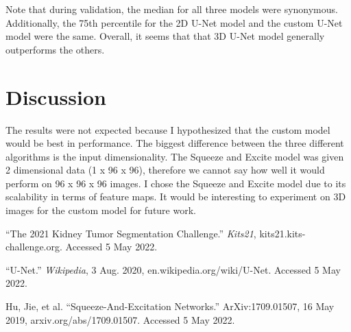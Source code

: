 \documentclass [12pt, letterpaper] {article}
\begin{document}
Note that during validation, the median for all three models were synonymous. Additionally, the 75th percentile for the 2D U-Net model and the custom U-Net model were the same. Overall, it seems that that 3D U-Net model generally outperforms the others. 

\section{Discussion}
The results were not expected because I hypothesized that the custom model would be best in performance. The biggest difference between the three different algorithms is the input dimensionality. The Squeeze and Excite model was given 2 dimensional data (1 x 96 x 96), therefore we cannot say how well it would perform on 96 x 96 x 96 images. I chose the Squeeze and Excite model due to its scalability in terms of feature maps. It would be interesting to experiment on 3D images for the custom model for future work. 


\begin{thebibliography}{2}
“The 2021 Kidney Tumor Segmentation Challenge.” \emph{Kits21}, kits21.kits-challenge.org. Accessed 5 May 2022.

“U-Net.” \emph{Wikipedia}, 3 Aug. 2020, en.wikipedia.org/wiki/U-Net. Accessed 5 May 2022.

Hu, Jie, et al. “Squeeze-And-Excitation Networks.” ArXiv:1709.01507, 16 May 2019, arxiv.org/abs/1709.01507. Accessed 5 May 2022.
\end{thebibliography}
\end{document}
